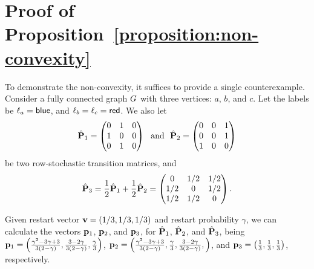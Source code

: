 \section{Proof of Proposition~\ref{proposition:non-convexity}}
\label{appendix:omitted-proposition-non-convexity}

To demonstrate the non-convexity, it suffices to provide a single counterexample. Consider a fully connected graph $G$ with three vertices: $a$, $b$, and $c$. Let the labels be $\labelof_a =\mathsf{blue}$, and $\labelof_b = \labelof_c = \mathsf{red}$. We also let 
\[ 
\hat{\mathbf{{P}}}_1 =  \begin{pmatrix}
0 & 1 & 0 \\
1 & 0 & 0 \\
0 & 1 & 0 \\
\end{pmatrix} 
~\mbox{ and }~ 
\hat{\mathbf{{P}}}_2 =  \begin{pmatrix}
0 & 0 & 1 \\
0 & 0 & 1 \\
1 & 0 & 0 \\
\end{pmatrix}\] 
be two row-stochastic transition matrices, and 
\[
\hat{\mathbf{{P}}}_3 = \frac{1}{2}\hat{\mathbf{{P}}}_1 + \frac{1}{2}\hat{\mathbf{{P}}}_2 = \begin{pmatrix}
0 & 1/2 & 1/2 \\
1/2 & 0 & 1/2 \\
1/2 & 1/2 & 0 \\
\end{pmatrix}.
\]

Given restart vector $\mathbf{{v}} = (1/3, 1/3, 1/3)$ and restart probability $\gamma$, 
we can calculate the \pagerank vectors $\mathbf{{p}}_1$, $\mathbf{{p}}_2$, and $\mathbf{{p}}_3$, 
for $\hat{\mathbf{{P}}}_1$, $\hat{\mathbf{{P}}}_2$, and $\hat{\mathbf{{P}}}_3$, 
being 
$\mathbf{{p}}_1 = \left(\frac{\gamma^2-3\gamma+3}{3(2-\gamma)}, \frac{3-2\gamma}{3(2-\gamma)}, \frac{\gamma}{3}\right)$, 
$\mathbf{{p}}_2=\left(\frac{\gamma^2-3\gamma+3}{3(2-\gamma)},  \frac{\gamma}{3}, \frac{3-2\gamma}{3(2-\gamma)},\right)$, and 
$\mathbf{{p}}_3=\left( \frac{1}{3},\frac{1}{3},\frac{1}{3}\right)$, respectively. 

